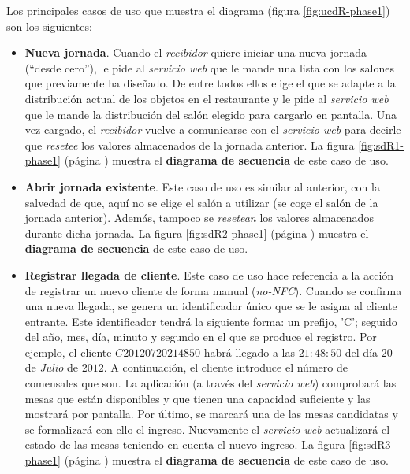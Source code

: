 Los principales casos de uso que muestra el diagrama (figura
\ref{fig:ucdR-phase1}) son los siguientes:
\begin{itemize}
\item \textbf{Nueva jornada}. Cuando el \emph{recibidor} quiere iniciar una
nueva jornada (``desde cero''), le pide al \emph{servicio web} que le mande 
una lista con los salones que previamente ha diseñado. De entre todos ellos
elige el que se adapte a la distribución actual de los objetos en el
restaurante y le pide al \emph{servicio web} que le mande la distribución del
salón elegido para cargarlo en pantalla. Una vez cargado, el \emph{recibidor}
vuelve a comunicarse con el \emph{servicio web} para decirle que \emph{resetee}
los valores almacenados de la jornada anterior. La figura \ref{fig:sdR1-phase1}
(página \pageref{fig:sdR1-phase1}) muestra el \textbf{diagrama de secuencia} 
de este caso de uso.

\item \textbf{Abrir jornada existente}. Este caso de uso es similar al
anterior, con la salvedad de que, aquí no se elige el salón a
utilizar (se coge el salón de la jornada anterior). Además, tampoco se
\emph{resetean} los valores almacenados durante dicha jornada. La figura
\ref{fig:sdR2-phase1} (página \pageref{fig:sdR2-phase1}) muestra el
\textbf{diagrama de secuencia} de este caso de uso.

\item \textbf{Registrar llegada de cliente}. Este caso de uso hace referencia
a la acción de registrar un nuevo cliente de forma manual
(\emph{no-\acs{NFC}}). Cuando se confirma una nueva llegada, se
genera un identificador único que se le asigna al cliente entrante.
Este identificador tendrá la siguiente forma: un prefijo, 'C'; seguido del
año, mes, día, minuto y segundo en el que se produce el registro. Por ejemplo,
el cliente $C20120720214850$ habrá llegado a las $21:48:50$ del día $20$ de
\emph{Julio} de $2012$. A continuación, el cliente introduce el número de
comensales que son. La aplicación (a través del \emph{servicio web})
comprobará las mesas que están disponibles y que tienen una capacidad
suficiente y las mostrará por pantalla. Por último, se marcará una de las
mesas candidatas y se formalizará con ello el ingreso. Nuevamente el
\emph{servicio web} actualizará el estado de las mesas teniendo en cuenta el
nuevo ingreso. La figura \ref{fig:sdR3-phase1} (página
\pageref{fig:sdR3-phase1}) muestra el \textbf{diagrama de secuencia} de este
caso de uso.


\end{itemize}
